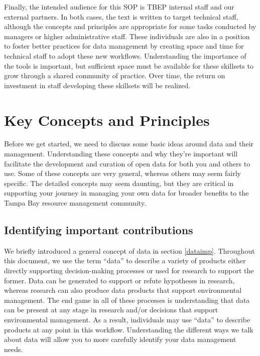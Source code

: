 \documentclass[
]{book}
\begin{document}
Finally, the intended audience for this SOP is TBEP internal staff and our external partners. In both cases, the text is written to target technical staff, although the concepts and principles are appropriate for some tasks conducted by managers or higher administrative staff. These individuals are also in a position to foster better practices for data management by creating space and time for technical staff to adopt these new workflows. Understanding the importance of the tools is important, but sufficient space must be available for these skillsets to grow through a shared community of practice. Over time, the return on investment in staff developing these skillsets will be realized.

\chapter{Key Concepts and Principles}\label{keys}

Before we get started, we need to discuss some basic ideas around data and their management. Understanding these concepts and why they're important will facilitate the development and curation of open data for both you and others to use. Some of these concepts are very general, whereas others may seem fairly specific. The detailed concepts may seem daunting, but they are critical in supporting your journey in managing your own data for broader benefits to the Tampa Bay resource management community.

\section{Identifying important contributions}\label{contribs}

We briefly introduced a general concept of data in section \ref{dataimp}. Throughout this document, we use the term ``data'' to describe a variety of products either directly supporting decision-making processes or used for research to support the former. Data can be generated to support or refute hypotheses in research, whereas research can also produce data products that support environmental management. The end game in all of these processes is understanding that data can be present at any stage in research and/or decisions that support environmental management. As a result, individuals may use ``data'' to describe products at any point in this workflow. Understanding the different ways we talk about data will allow you to more carefully identify your data management needs.
\end{document}
